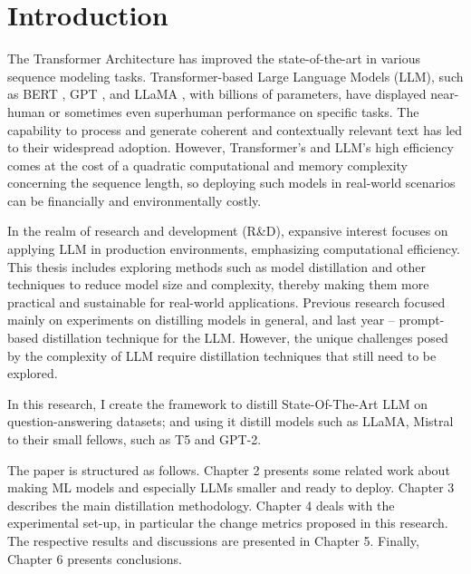 \chapter{Introduction}
\label{chap:intro}

The Transformer Architecture \cite{attention} has improved the state-of-the-art in various sequence modeling tasks. Transformer-based Large Language Models (LLM), such as BERT \cite{bert}, GPT \cite{gpt}, and LLaMA \cite{llama,llama2}, with billions of parameters, have displayed near-human or sometimes even superhuman performance on specific tasks. The capability to process and generate coherent and contextually relevant text has led to their widespread adoption. However, Transformer's and LLM's high efficiency comes at the cost of a quadratic computational and memory complexity concerning the sequence length, so deploying such models in real-world scenarios can be financially and environmentally costly.

In the realm of research and development (R\&D), expansive interest focuses on applying LLM in production environments, emphasizing computational efficiency. This thesis includes exploring methods such as model distillation and other techniques to reduce model size and complexity, thereby making them more practical and sustainable for real-world applications. Previous research focused mainly on experiments on distilling models in general, and last year – prompt-based distillation technique for the LLM\@. However, the unique challenges posed by the complexity of LLM require distillation techniques that still need to be explored.

In this research, I create the framework to distill State-Of-The-Art LLM on question-answering datasets; and using it distill models such as LLaMA, Mistral \cite{mistral} to their small fellows, such as T5 and GPT-2.

The paper is structured as follows. Chapter 2 presents some related work about making ML models and especially LLMs smaller and ready to deploy. Chapter 3 describes the main distillation methodology. Chapter 4 deals with the experimental set-up, in particular the change metrics proposed in this research. The respective results and discussions are presented in Chapter 5. Finally, Chapter 6 presents conclusions.
